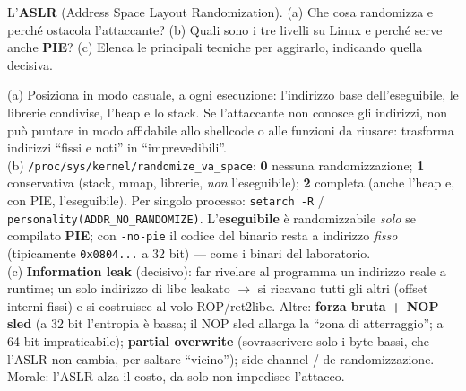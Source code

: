 \question[7]
L'\textbf{ASLR} (Address Space Layout Randomization). (a) Che cosa randomizza e perché ostacola l'attaccante? (b) Quali sono i tre livelli su Linux e perché serve anche \textbf{PIE}? (c) Elenca le principali tecniche per aggirarlo, indicando quella decisiva.
\begin{solution}
(a) Posiziona in modo casuale, a ogni esecuzione: l'indirizzo base dell'eseguibile, le librerie condivise, l'heap e lo stack. Se l'attaccante non conosce gli indirizzi, non può puntare in modo affidabile allo shellcode o alle funzioni da riusare: trasforma indirizzi ``fissi e noti'' in ``imprevedibili''.\\
(b) \lstinline|/proc/sys/kernel/randomize_va_space|: \textbf{0} nessuna randomizzazione; \textbf{1} conservativa (stack, mmap, librerie, \emph{non} l'eseguibile); \textbf{2} completa (anche l'heap e, con PIE, l'eseguibile). Per singolo processo: \lstinline|setarch -R| / \lstinline|personality(ADDR_NO_RANDOMIZE)|. L'\textbf{eseguibile} è randomizzabile \emph{solo} se compilato \textbf{PIE}; con \lstinline|-no-pie| il codice del binario resta a indirizzo \emph{fisso} (tipicamente \lstinline|0x0804...| a 32 bit) --- come i binari del laboratorio.\\
(c) \textbf{Information leak} (decisivo): far rivelare al programma un indirizzo reale a runtime; un solo indirizzo di libc leakato $\to$ si ricavano tutti gli altri (offset interni fissi) e si costruisce al volo ROP/ret2libc. Altre: \textbf{forza bruta + NOP sled} (a 32 bit l'entropia è bassa; il NOP sled allarga la ``zona di atterraggio''; a 64 bit impraticabile); \textbf{partial overwrite} (sovrascrivere solo i byte bassi, che l'ASLR non cambia, per saltare ``vicino''); side-channel / de-randomizzazione. Morale: l'ASLR alza il costo, da solo non impedisce l'attacco.
\end{solution}
